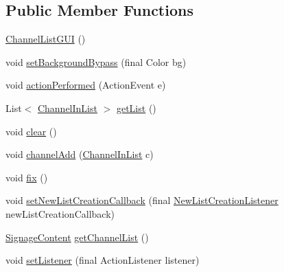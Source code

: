\subsection*{Public Member Functions}
\begin{DoxyCompactItemize}
\item 
\hyperlink{classgov_1_1fnal_1_1ppd_1_1dd_1_1channel_1_1list_1_1ChannelListGUI_aa77fb4a7871b4c2661fe3638b773ed0a}{Channel\-List\-G\-U\-I} ()
\item 
void \hyperlink{classgov_1_1fnal_1_1ppd_1_1dd_1_1channel_1_1list_1_1ChannelListGUI_a0248f91962f51286514741ca3ae22be5}{set\-Background\-Bypass} (final Color bg)
\item 
void \hyperlink{classgov_1_1fnal_1_1ppd_1_1dd_1_1channel_1_1list_1_1ChannelListGUI_a12130d6b9b424cbf7c04999edd338e91}{action\-Performed} (Action\-Event e)
\item 
List$<$ \hyperlink{interfacegov_1_1fnal_1_1ppd_1_1dd_1_1channel_1_1ChannelInList}{Channel\-In\-List} $>$ \hyperlink{classgov_1_1fnal_1_1ppd_1_1dd_1_1channel_1_1list_1_1ChannelListGUI_a3f5795ae59811730376ca998cca2df38}{get\-List} ()
\item 
void \hyperlink{classgov_1_1fnal_1_1ppd_1_1dd_1_1channel_1_1list_1_1ChannelListGUI_a49d5de5df273113318fc59de3d298967}{clear} ()
\item 
void \hyperlink{classgov_1_1fnal_1_1ppd_1_1dd_1_1channel_1_1list_1_1ChannelListGUI_aac2bcf918b3c9685681739a3dcbdf9c4}{channel\-Add} (\hyperlink{interfacegov_1_1fnal_1_1ppd_1_1dd_1_1channel_1_1ChannelInList}{Channel\-In\-List} c)
\item 
void \hyperlink{classgov_1_1fnal_1_1ppd_1_1dd_1_1channel_1_1list_1_1ChannelListGUI_a8baf2ca96aea0b400f39ce50297f191b}{fix} ()
\item 
void \hyperlink{classgov_1_1fnal_1_1ppd_1_1dd_1_1channel_1_1list_1_1ChannelListGUI_aab16046287399636afa75b7d299c2048}{set\-New\-List\-Creation\-Callback} (final \hyperlink{interfacegov_1_1fnal_1_1ppd_1_1dd_1_1channel_1_1list_1_1NewListCreationListener}{New\-List\-Creation\-Listener} new\-List\-Creation\-Callback)
\item 
\hyperlink{interfacegov_1_1fnal_1_1ppd_1_1dd_1_1signage_1_1SignageContent}{Signage\-Content} \hyperlink{classgov_1_1fnal_1_1ppd_1_1dd_1_1channel_1_1list_1_1ChannelListGUI_aec3f27a75e070f286225a7e8e69aeca1}{get\-Channel\-List} ()
\item 
void \hyperlink{classgov_1_1fnal_1_1ppd_1_1dd_1_1channel_1_1list_1_1ChannelListGUI_ac4fca92d4bc81f9ed0ba0c53b31a07e7}{set\-Listener} (final Action\-Listener listener)
\end{DoxyCompactItemize}

